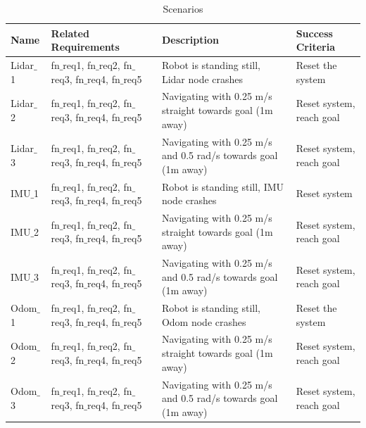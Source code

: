 \begin{table}[ht]
\label{tab:sensor_scenarios}
\caption{Scenarios}
	\begin{tabular}{| m{} | m{}| m{} | m{}|} 
  	\hline
  	Name & Related Requirements & Description & Success Criteria\\ 
  	\hline
  	Lidar$\_$1 & fn$\_$req1, fn$\_$req2, fn$\_$req3, fn$\_$req4, fn$\_$req5 & Robot is standing still, Lidar node crashes & Reset the system\\ 
  	\hline
  	Lidar$\_$2 & fn$\_$req1, fn$\_$req2, fn$\_$req3, fn$\_$req4, fn$\_$req5 & Navigating with 0.25 m/s straight towards goal (1m away) & Reset system, reach goal \\ 
  	\hline
  	Lidar$\_$3 & fn$\_$req1, fn$\_$req2, fn$\_$req3, fn$\_$req4, fn$\_$req5 & Navigating with 0.25 m/s and 0.5 rad/s towards goal (1m away) & Reset system, reach goal\\
  	\hline
  	IMU$\_$1 & fn$\_$req1, fn$\_$req2, fn$\_$req3, fn$\_$req4, fn$\_$req5 & Robot is standing still, IMU node crashes & Reset system \\
  	\hline
  	IMU$\_$2 & fn$\_$req1, fn$\_$req2, fn$\_$req3, fn$\_$req4, fn$\_$req5 & Navigating with 0.25 m/s straight towards goal (1m away) & Reset system, reach goal \\ 
  	\hline
  	IMU$\_$3 & fn$\_$req1, fn$\_$req2, fn$\_$req3, fn$\_$req4, fn$\_$req5 & Navigating with 0.25 m/s and 0.5 rad/s towards goal (1m away) & Reset system, reach goal\\
  	\hline
  	Odom$\_$1 & fn$\_$req1, fn$\_$req2, fn$\_$req3, fn$\_$req4, fn$\_$req5 & Robot is standing still, Odom node crashes & Reset the system\\ 
  	\hline
  	Odom$\_$2 & fn$\_$req1, fn$\_$req2, fn$\_$req3, fn$\_$req4, fn$\_$req5 & Navigating with 0.25 m/s straight towards goal (1m away) & Reset system, reach goal \\ 
  	\hline
  	Odom$\_$3 & fn$\_$req1, fn$\_$req2, fn$\_$req3, fn$\_$req4, fn$\_$req5 & Navigating with 0.25 m/s and 0.5 rad/s towards goal (1m away) & Reset system, reach goal\\
  	\hline
 	\end{tabular}
\end{table} 	
  	

